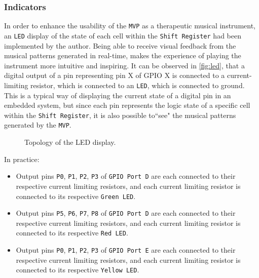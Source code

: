 \documentclass[12pt]{article}
\begin{document}
\subsubsection{Indicators}
In order to enhance the usability of the \texttt{MVP} as a therapeutic musical instrument, an \texttt{LED} display of the state of each cell within the \texttt{Shift Register} had been implemented by the author. Being able to receive visual feedback from the musical patterns generated in real-time, makes the experience of playing the instrument more intuitive and inspiring. It can be observed in \autoref{fig:led}, that a digital output of a pin representing pin X of GPIO X is connected to a current-limiting resistor, which is connected to an \texttt{LED}, which is connected to ground. This is a typical way of displaying the current state of a digital pin in an embedded system, but since each pin represents the logic state of a specific cell within the \texttt{Shift Register}, it is also possible to``see" the musical patterns generated by the \texttt{MVP}.
\begin{figure}[ht]
    \centering
    \caption{Topology of the LED display.}
    \label{fig:led}
\end{figure}
In practice:
\begin{itemize}
    \item Output pins \texttt{P0}, \texttt{P1}, \texttt{P2}, \texttt{P3} of \texttt{GPIO Port D} are each connected to their respective current limiting resistors, and each current limiting resistor is connected to its respective \texttt{Green LED}.

    \item Output pins \texttt{P5}, \texttt{P6}, \texttt{P7}, \texttt{P8} of \texttt{GPIO Port D} are each connected to their respective current limiting resistors, and each current limiting resistor is connected to its respective \texttt{Red LED}.

    \item Output pins \texttt{P0}, \texttt{P1}, \texttt{P2}, \texttt{P3} of \texttt{GPIO Port E} are each connected to their respective current limiting resistors, and each current limiting resistor is connected to its respective \texttt{Yellow LED}.
\end{itemize}
\end{document}
